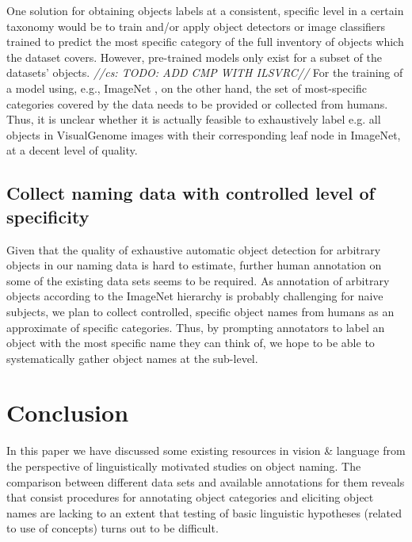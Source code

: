 \documentclass[runningheads]{llncs}
\newcommand{\cs}[1]{\textcolor{PineGreen}{\emph{//cs: #1//}}}
\begin{document}
One solution for obtaining objects labels at a consistent, specific level in a certain taxonomy would be to train and/or apply object detectors or image classifiers trained to predict the most specific category of the full inventory of objects which the dataset covers. 
However, pre-trained models only exist for a subset of the datasets' objects. \cs{TODO: ADD CMP WITH ILSVRC}
For the training of a model using, e.g., ImageNet \cite{imagenet_cvpr09}, on the other hand, the  set of most-specific categories covered by the data needs to be provided or collected from humans. 
Thus, it is unclear whether it is actually feasible to exhaustively label e.g. all objects in VisualGenome images with their corresponding leaf node in ImageNet, at a decent level of quality. 



\subsection{Collect naming data with controlled level of specificity}

Given that the quality of exhaustive automatic object detection for arbitrary objects in our naming data is hard to estimate, further human annotation on some of the existing data sets seems to be required.
As annotation of arbitrary objects according to the ImageNet hierarchy is probably challenging for naive subjects, we plan to collect controlled, specific object names from humans as an approximate of specific categories.
Thus, by prompting annotators to label an object with the most specific name they can think of, we hope to be able to systematically gather object names at the sub-level.


%


\section{Conclusion}

In this paper we have discussed some existing resources in vision \& language from the perspective of linguistically motivated studies on object naming.  
The comparison between different data sets and available annotations for them reveals that consist procedures for annotating object categories and eliciting object names are lacking to an extent that testing of  basic linguistic hypotheses (related to use of concepts) turns out to be difficult.



\clearpage

\begin{footnotesize}

\end{footnotesize}
\end{document}

